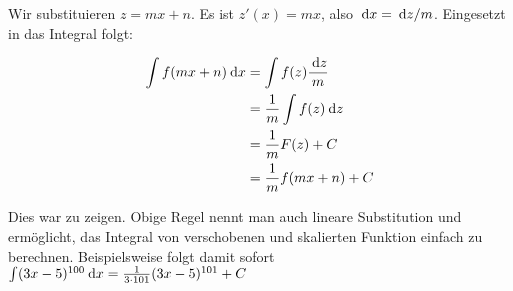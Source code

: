 \item Wir substituieren $z=mx+n$. Es ist $z'(x)=mx$, also $\:\mathrm{d}{x} = \:\mathrm{d}{z}/m$. Eingesetzt in das Integral folgt:

\begin{alignat*}{1}
	\int f(mx+n) \:\mathrm{d}{x} &= \int f(z) \frac{\:\mathrm{d}{z}}{m} \\
	                      &= \frac{1}{m} \int f(z) \:\mathrm{d}{z} \\
	                      &= \frac{1}{m} F(z) + C\\
	                      &= \frac{1}{m} f(mx+n) + C
\end{alignat*}

Dies war zu zeigen. Obige Regel nennt man auch lineare Substitution und ermöglicht, das Integral von verschobenen und skalierten Funktion einfach zu berechnen. Beispielsweise folgt damit sofort $\int (3x-5)^{100} \:\mathrm{d}{x} = \frac{1}{3\cdot 101} (3x-5)^{101} + C$